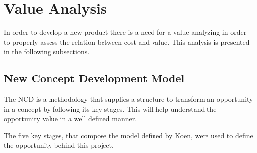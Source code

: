 
\chapter{Value Analysis} %
\label{chap:Chapter3} %

In order to develop a new product there is a need for a value analyzing in order to properly assess the relation between cost and value.
This analysis is presented in the following subsections.

\section{New Concept Development Model}

The \gls{NCD}\cite{koen2001providing} is a methodology that supplies a structure to transform an opportunity in a concept by following its key stages.
This will help understand the opportunity value in a well defined manner.

The five key stages, that compose the model defined by Koen\cite{koen2001providing}, were used to define the opportunity behind this project.


